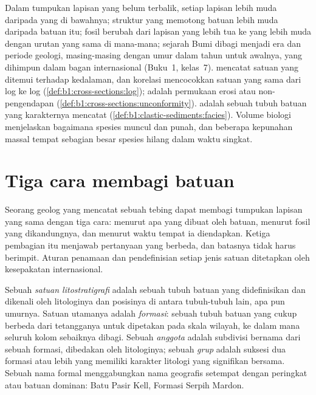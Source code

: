 \begin{recall}
Dalam tumpukan lapisan yang belum terbalik, setiap lapisan lebih muda daripada yang di bawahnya; struktur yang memotong batuan lebih muda daripada batuan itu; fosil berubah dari lapisan yang lebih tua ke yang lebih muda dengan urutan yang sama di mana-mana; sejarah Bumi dibagi menjadi era dan periode geologi, masing-masing dengan umur dalam tahun untuk awalnya, yang dihimpun dalam bagan internasional (Buku~1, kelas~7).  mencatat satuan yang ditemui terhadap kedalaman, dan korelasi mencocokkan satuan yang sama dari log ke log (\cref{def:b1:cross-sections:log});  adalah permukaan erosi atau non-pengendapan (\cref{def:b1:cross-sections:unconformity}).  adalah sebuah tubuh batuan yang karakternya mencatat  (\cref{def:b1:clastic-sediments:facies}). Volume biologi menjelaskan bagaimana spesies muncul dan punah, dan beberapa kepunahan massal tempat sebagian besar spesies hilang dalam waktu singkat.
\end{recall}

\section{Tiga cara membagi batuan}\label{sec:b1:stratigraphic-scale:three}

Seorang geolog yang mencatat sebuah tebing dapat membagi tumpukan lapisan yang sama dengan tiga cara: menurut apa yang dibuat oleh batuan, menurut fosil yang dikandungnya, dan menurut waktu tempat ia diendapkan. Ketiga pembagian itu menjawab pertanyaan yang berbeda, dan batasnya tidak harus berimpit. Aturan penamaan dan pendefinisian setiap jenis satuan ditetapkan oleh kesepakatan internasional.

\begin{definition}\label{def:b1:stratigraphic-scale:lithostratigraphy}
Sebuah \emph{satuan litostratigrafi} adalah sebuah tubuh batuan yang didefinisikan dan dikenali oleh litologinya dan posisinya di antara tubuh-tubuh lain, apa pun umurnya. Satuan utamanya adalah \emph{formasi}: sebuah tubuh batuan yang cukup berbeda dari tetangganya untuk dipetakan pada skala wilayah, ke dalam mana seluruh kolom sebaiknya dibagi. Sebuah \emph{anggota} adalah subdivisi bernama dari sebuah formasi, dibedakan oleh litologinya; sebuah \emph{grup} adalah suksesi dua formasi atau lebih yang memiliki karakter litologi yang signifikan bersama. Sebuah nama formal menggabungkan nama geografis setempat dengan peringkat atau batuan dominan: Batu Pasir Kell, Formasi Serpih Mardon.
\end{definition}

